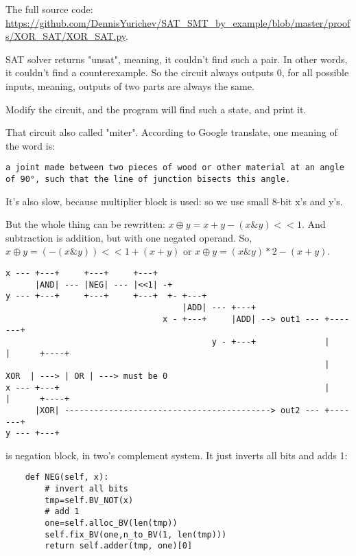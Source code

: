 The full source code: \url{https://github.com/DennisYurichev/SAT_SMT_by_example/blob/master/proofs/XOR_SAT/XOR_SAT.py}.

SAT solver returns "unsat", meaning, it couldn't find such a pair.
In other words, it couldn't find a counterexample.
So the circuit always outputs 0, for all possible inputs, meaning, outputs of two parts are always the same.

Modify the circuit, and the program will find such a state, and print it.

That circuit also called "miter".
According to Google translate, one meaning of the word is:

\begin{lstlisting}
a joint made between two pieces of wood or other material at an angle of 90°, such that the line of junction bisects this angle.
\end{lstlisting}

It's also slow, because multiplier block is used: so we use small 8-bit x's and y's.

But the whole thing can be rewritten: $x \oplus y = x+y - (x \& y)<<1$.
And subtraction is addition, but with one negated operand.
So, $x \oplus y = (-(x \& y))<<1 + (x + y)$ or
$x \oplus y = (x \& y)*2 - (x + y)$.

\begin{lstlisting}[basicstyle=\footnotesize]
x --- +---+     +---+     +---+
      |AND| --- |NEG| --- |<<1| -+ 
y --- +---+     +---+     +---+  +- +---+
                                    |ADD| --- +---+
                                x - +---+     |ADD| --> out1 --- +-------+
                                          y - +---+              |       |      +----+
                                                                 |  XOR  | ---> | OR | ---> must be 0
x --- +---+                                                      |       |      +----+
      |XOR| ------------------------------------------> out2 --- +-------+
y --- +---+
\end{lstlisting}

 is negation block, in two's complement system.
It just inverts all bits and adds 1:

\begin{lstlisting}
    def NEG(self, x):
        # invert all bits
        tmp=self.BV_NOT(x)
        # add 1
        one=self.alloc_BV(len(tmp))
        self.fix_BV(one,n_to_BV(1, len(tmp)))
        return self.adder(tmp, one)[0]
\end{lstlisting}

